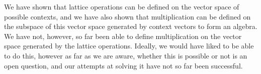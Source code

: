 
We have shown that lattice operations can be defined on the vector space of possible contexts, and we have also shown that multiplication can be defined on the subspace of this vector space generated by context vectors to form an algebra. We have not, however, so far been able to define multiplication on the vector space generated by the lattice operations. Ideally, we would have liked to be able to do this, however as far as we are aware, whether this is possible or not is an open question, and our attempts at solving it have not so far been successful.

%
%

% 
